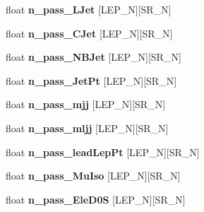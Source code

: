 \begin{DoxyCompactItemize}
\item 
\hypertarget{classSusySelection_a3325c5aa51ee61af02cf7e8a9120bf1e}{
float {\bfseries n\_\-pass\_\-LJet} \mbox{[}LEP\_\-N\mbox{]}\mbox{[}SR\_\-N\mbox{]}}
\label{classSusySelection_a3325c5aa51ee61af02cf7e8a9120bf1e}

\item 
\hypertarget{classSusySelection_a2a905c001e856564cc5b6a44a74b6157}{
float {\bfseries n\_\-pass\_\-CJet} \mbox{[}LEP\_\-N\mbox{]}\mbox{[}SR\_\-N\mbox{]}}
\label{classSusySelection_a2a905c001e856564cc5b6a44a74b6157}

\item 
\hypertarget{classSusySelection_a98835ce69db71b7f7f0bb3a8a36bbaa2}{
float {\bfseries n\_\-pass\_\-NBJet} \mbox{[}LEP\_\-N\mbox{]}\mbox{[}SR\_\-N\mbox{]}}
\label{classSusySelection_a98835ce69db71b7f7f0bb3a8a36bbaa2}

\item 
\hypertarget{classSusySelection_a5f307a757b5e51a4f09cf468ac382ece}{
float {\bfseries n\_\-pass\_\-JetPt} \mbox{[}LEP\_\-N\mbox{]}\mbox{[}SR\_\-N\mbox{]}}
\label{classSusySelection_a5f307a757b5e51a4f09cf468ac382ece}

\item 
\hypertarget{classSusySelection_a0705322827f14b51cba208308fc40e4a}{
float {\bfseries n\_\-pass\_\-mjj} \mbox{[}LEP\_\-N\mbox{]}\mbox{[}SR\_\-N\mbox{]}}
\label{classSusySelection_a0705322827f14b51cba208308fc40e4a}

\item 
\hypertarget{classSusySelection_aea6aaeb19cea5b3caa0c1c6efa2c46fa}{
float {\bfseries n\_\-pass\_\-mljj} \mbox{[}LEP\_\-N\mbox{]}\mbox{[}SR\_\-N\mbox{]}}
\label{classSusySelection_aea6aaeb19cea5b3caa0c1c6efa2c46fa}

\item 
\hypertarget{classSusySelection_ac45ca0a989eeb6da1de2305ed95ebd86}{
float {\bfseries n\_\-pass\_\-leadLepPt} \mbox{[}LEP\_\-N\mbox{]}\mbox{[}SR\_\-N\mbox{]}}
\label{classSusySelection_ac45ca0a989eeb6da1de2305ed95ebd86}

\item 
\hypertarget{classSusySelection_a92ed16d9d6187ea22c89802ee48e4214}{
float {\bfseries n\_\-pass\_\-MuIso} \mbox{[}LEP\_\-N\mbox{]}\mbox{[}SR\_\-N\mbox{]}}
\label{classSusySelection_a92ed16d9d6187ea22c89802ee48e4214}

\item 
\hypertarget{classSusySelection_a29f51042bd878394996bc46ed0da8a6c}{
float {\bfseries n\_\-pass\_\-EleD0S} \mbox{[}LEP\_\-N\mbox{]}\mbox{[}SR\_\-N\mbox{]}}
\label{classSusySelection_a29f51042bd878394996bc46ed0da8a6c}


\end{DoxyCompactItemize}
